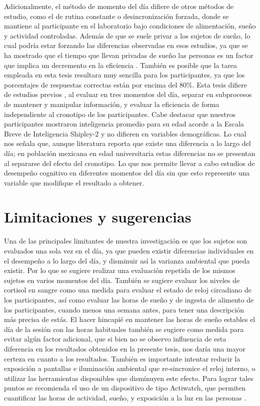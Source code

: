 \documentclass[12pt,letterpaper,final]{article}
\let\cite\cite %
\begin{document}
Adicionalmente, el método de momento del día difiere de otros métodos de estudio, como el de rutina constante o desincronización forzada, donde se mantiene al participante en el laboratorio bajo condiciones de alimentación, sueño y actividad controladas. Además de que se suele privar a los sujetos de sueño, lo cual podría estar forzando las diferencias observadas en esos estudios, ya que se ha mostrado que el tiempo que llevan privadas de sueño las personas es un factor que implica un decremento en la eficiencia \cite{Wright2002}. También es posible que la tarea empleada en esta tesis resultara muy sencilla para los participantes, ya que los porcentajes de respuestas correctas están por encima del 80\%. Esta tesis difiere de estudios previos \cite{Baddeley1970,Schmidt2015}, al evaluar en tres momentos del día, separar en subprocesos de mantener y manipular información, y evaluar la eficiencia de forma independiente al cronotipo de los participantes. Cabe destacar que nuestros participantes mostraron inteligencia promedio para su edad acorde a la Escala Breve de Inteligencia Shipley-2 \cite{Shipley2014} y no difieren en variables demográficas. Lo cual nos señala que, aunque literatura reporta que existe una diferencia a lo largo del día; en población mexicana en edad universitaria estas diferencias no se presentan al separarse del efecto del cronotipo. Lo que nos permite llevar a cabo estudios de desempeño cognitivo en diferentes momentos del día sin que esto represente una variable que modifique el resultado a obtener.


\section{Limitaciones y sugerencias}
Una de las principales limitantes de nuestra investigación es que los sujetos son evaluados una sola vez en el día, ya que pueden existir diferencias individuales en el desempeño a lo largo del día, y disminuir así la varianza ambiental que pueda existir. Por lo que se sugiere realizar una evaluación repetida de los mismos sujetos en varios momentos del día. También se sugiere evaluar los niveles de cortisol en sangre como una medida para evaluar el estado de reloj circadiano de los participantes, así como evaluar las horas de sueño y de ingesta de alimento de los participantes, cuando menos una semana antes, para tener una descripción más precisa de estás. El hacer hincapié en mantener las horas de sueño estables el día de la sesión con las horas habituales también se sugiere como medida para evitar algún factor adicional, que si bien no se observo influencia de esta diferencia en los resultados obtenidos en la presente tesis, nos daría una mayor certeza en cuanto a los resultados.   También es importante intentar reducir la exposición a pantallas e iluminación ambiental que re-sincronice el reloj interno, o utilizar las herramientas disponibles que disminuyen este efecto.  Para lograr tales puntos se recomienda el uso de un dispositivo de tipo Actiwatch, que permiten cuantificar las horas de actividad, sueño, y exposición a la luz en las personas \cite{Figueiro2013}.
\end{document}
